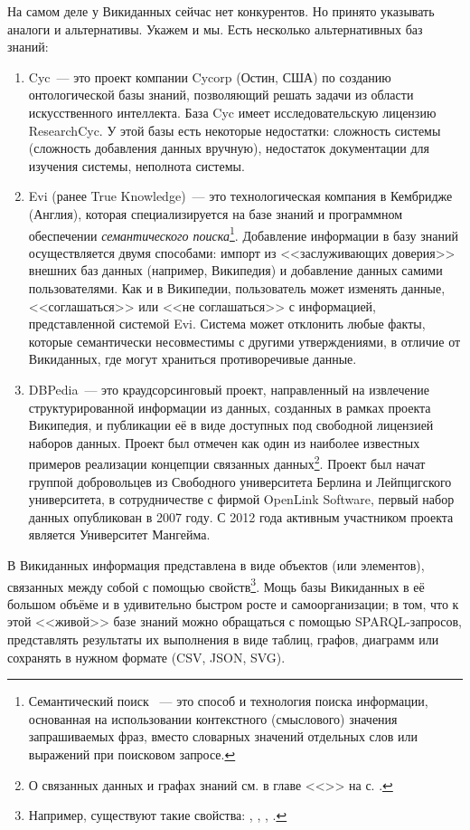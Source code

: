 На самом деле у Викиданных сейчас нет конкурентов. Но принято указывать аналоги и альтернативы. Укажем и мы. Есть несколько альтернативных баз знаний:
\begin{enumerate}
\item Cyc~--- это проект компании Cycorp (Остин, США) по созданию онтологической базы знаний, позволяющий решать задачи из области искусственного интеллекта\autocite{Cyc}. База Cyc имеет исследовательскую лицензию ResearchCyc. У этой базы есть некоторые недостатки: сложность системы (сложность добавления данных
вручную), недостаток документации для изучения системы, неполнота системы.
\item Evi (ранее True Knowledge\autocite{True_Knowledge})~--- это технологическая компания в Кембридже (Англия), которая специализируется на базе знаний и программном обеспечении \textit{семантического поиска}\footnote[][5pt]{Семантический поиск ~---  это способ и технология поиска информации, основанная на использовании контекстного (смыслового) значения запрашиваемых фраз, вместо словарных значений отдельных слов или выражений при поисковом запросе.}. Добавление информации в базу знаний осуществляется двумя способами: импорт из <<заслуживающих доверия>> внешних баз данных (например, Википедия) и добавление данных самими пользователями. Как и в Википедии, пользователь может изменять
данные, <<соглашаться>> или <<не соглашаться>> с информацией, представленной системой Evi. Система может отклонить любые факты, которые семантически несовместимы с другими утверждениями, в отличие от Викиданных, где могут
храниться противоречивые данные.
\item DBPedia~--- это краудсорсинговый проект, 
    направленный на извлечение структурированной информации из данных, 
        созданных в рамках проекта Википедия, 
        и публикации её в виде доступных под свободной лицензией наборов данных. 
        Проект был отмечен как один из наиболее известных примеров реализации 
        концепции связанных данных\footnote[][]{%
%
О связанных данных и графах знаний см. в главе <<>> на с. \pageref{ch:BucketsAndBalls}.%
%
}. Проект был начат группой добровольцев из Свободного университета Берлина и Лейпцигского университета, в сотрудничестве с фирмой OpenLink Software, первый набор данных опубликован в 2007 году. С 2012 года активным участником проекта является Университет Мангейма.
\end{enumerate}
В Викиданных информация представлена в виде объектов (или элементов), 
связанных между собой с помощью свойств\footnote{%
%
Например, существуют такие свойства: , 
, , .%
%
}. Мощь базы Викиданных в её большом объёме и в удивительно быстром росте и самоорганизации; в том, что к этой <<живой>> базе знаний можно обращаться с помощью  SPARQL-запросов, представлять результаты их выполнения в виде таблиц, графов, диаграмм или сохранять в нужном формате (CSV, JSON, SVG).

